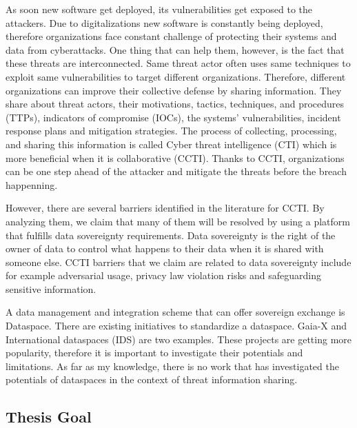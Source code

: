 \documentclass{article}
\begin{document}



As soon new software get deployed, its vulnerabilities get exposed to the attackers. Due to digitalizations new software is constantly being deployed, therefore organizations face constant challenge of protecting their systems and data from cyberattacks. One thing that can help them, however, is the fact that these threats are interconnected. Same threat actor often uses same techniques to exploit same vulnerabilities to target different organizations. Therefore, different organizations can improve their collective defense by sharing information. They share about threat actors, their motivations, tactics, techniques, and procedures (TTPs), indicators of compromise (IOCs), the systems' vulnerabilities, incident response plans and mitigation strategies. The process of collecting, processing, and sharing this information is called Cyber threat intelligence (CTI) which is more beneficial when it is collaborative (CCTI). Thanks to CCTI, organizations can be one step ahead of the attacker and mitigate the threats before the breach happenning.


However, there are several barriers identified in the literature \cite{zibak_cyber_2019} for CCTI. %
By analyzing them, we claim that many of them will be resolved by using a platform that fulfills data sovereignty requirements. Data sovereignty is the right of the owner of data to control what happens to their data when it is shared with someone else.
CCTI barriers that we claim are related to data sovereignty include for example adversarial usage, privacy law violation risks and safeguarding sensitive information.


A data management and integration scheme that can offer sovereign exchange is Dataspace. There are existing initiatives to standardize a dataspace. Gaia-X and International dataspaces (IDS) are two examples. These projects are getting more popularity, therefore it is important to investigate their potentials and limitations. As far as my knowledge, there is no work that has investigated the potentials of dataspaces in the context of threat information sharing. 

\subsection{Thesis Goal}
\end{document}
